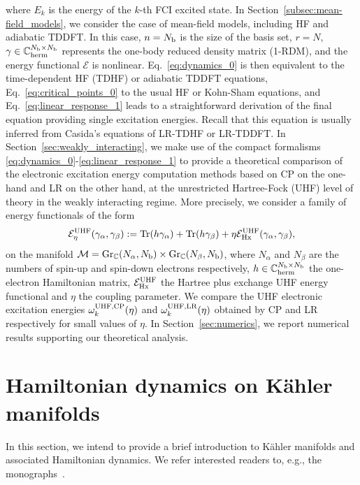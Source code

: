 \documentclass[11pt]{article}
\def\C{{\mathbb C}}
\begin{document}
where $E_k$ is the energy of the $k$-th FCI excited state. In Section~\ref{subsec:mean-field_models}, we consider the case of mean-field models, including HF and adiabatic TDDFT. In this case, $n=N_{\rm b}$ is the size of the basis set, $r=N$, $\gamma\in\C_{\rm herm}^{N_{\rm b}\times N_{\rm b}}$ represents the one-body reduced density matrix (1-RDM), and the energy functional ${\mathcal E}$ is nonlinear. Eq.~\eqref{eq:dynamics_0} is then equivalent to the time-dependent HF (TDHF) or adiabatic TDDFT equations, Eq.~\eqref{eq:critical_points_0} to the usual HF or Kohn-Sham equations, and Eq.~\eqref{eq:linear_response_1} leads to a straightforward derivation of the final equation providing single excitation energies. Recall that this equation is usually inferred from Casida's equations of LR-TDHF or LR-TDDFT.\supercite{CASIDA1995} In Section~\ref{sec:weakly_interacting}, we make use of the compact formalisms \eqref{eq:dynamics_0}-\eqref{eq:linear_response_1} to provide a theoretical comparison of the electronic excitation energy computation methods based on CP on the one-hand and LR on the other hand, at the unrestricted Hartree-Fock (UHF) \supercite{Pratt1956,Marshall1961,Amos1964,Fukutome1971} level of theory in the weakly interacting regime. More precisely, we consider a family of energy functionals of the form
$$
\mathcal{E}^{\rm UHF}_\eta(\gamma_\alpha,\gamma_\beta):={\rm Tr}(h\gamma_\alpha) + {\rm Tr}(h\gamma_\beta)+\eta {\mathcal E}_{\rm Hx}^{\rm UHF}(\gamma_\alpha,\gamma_\beta),
$$
on the manifold $\mathcal M={\rm Gr}_\C(N_\alpha,N_{\rm b}) \times {\rm Gr}_\C(N_\beta,N_{\rm b})$, where $N_\alpha$ and $N_\beta$ are the numbers of spin-up and spin-down electrons respectively, $h \in \C^{N_{\rm b} \times N_{\rm b}}_{\rm herm}$ the one-electron Hamiltonian matrix, ${\mathcal E}^{\rm UHF}_{\rm Hx}$ the Hartree plus exchange UHF energy functional and $\eta$ the coupling parameter. 
We compare the UHF electronic excitation energies $\omega^{\rm UHF,CP}_k(\eta)$ and  $\omega^{\rm UHF,LR}_k(\eta)$ obtained by CP and LR respectively for small values of $\eta$. In Section~\ref{sec:numerics}, we report numerical results supporting our theoretical analysis.


\section{Hamiltonian dynamics on K\"ahler manifolds}
\label{sec:Kahler}


\noindent
In this section, we intend to provide a brief introduction to K\"ahler manifolds and associated Hamiltonian dynamics. We refer interested readers to, e.g., the monographs~\cite{huybrechts2005complex,Moroianu_2007,wells2008differential}.
\end{document}

